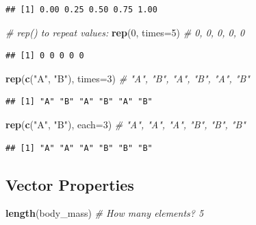 \documentclass[
]{article}
\newenvironment{Shaded}{\begin{snugshade}}{\end{snugshade}}
\newcommand{\AttributeTok}[1]{\textcolor[rgb]{0.13,0.29,0.53}{#1}}
\newcommand{\CommentTok}[1]{\textcolor[rgb]{0.56,0.35,0.01}{\textit{#1}}}
\newcommand{\DecValTok}[1]{\textcolor[rgb]{0.00,0.00,0.81}{#1}}
\newcommand{\FunctionTok}[1]{\textcolor[rgb]{0.13,0.29,0.53}{\textbf{#1}}}
\newcommand{\NormalTok}[1]{#1}
\newcommand{\StringTok}[1]{\textcolor[rgb]{0.31,0.60,0.02}{#1}}
\begin{document}
\begin{verbatim}
## [1] 0.00 0.25 0.50 0.75 1.00
\end{verbatim}

\begin{Shaded}
\begin{Highlighting}[]
\CommentTok{\# rep() to repeat values:}
\FunctionTok{rep}\NormalTok{(}\DecValTok{0}\NormalTok{, }\AttributeTok{times=}\DecValTok{5}\NormalTok{)                 }\CommentTok{\# 0, 0, 0, 0, 0}
\end{Highlighting}
\end{Shaded}

\begin{verbatim}
## [1] 0 0 0 0 0
\end{verbatim}

\begin{Shaded}
\begin{Highlighting}[]
\FunctionTok{rep}\NormalTok{(}\FunctionTok{c}\NormalTok{(}\StringTok{"A"}\NormalTok{, }\StringTok{"B"}\NormalTok{), }\AttributeTok{times=}\DecValTok{3}\NormalTok{)       }\CommentTok{\# "A", "B", "A", "B", "A", "B"}
\end{Highlighting}
\end{Shaded}

\begin{verbatim}
## [1] "A" "B" "A" "B" "A" "B"
\end{verbatim}

\begin{Shaded}
\begin{Highlighting}[]
\FunctionTok{rep}\NormalTok{(}\FunctionTok{c}\NormalTok{(}\StringTok{"A"}\NormalTok{, }\StringTok{"B"}\NormalTok{), }\AttributeTok{each=}\DecValTok{3}\NormalTok{)        }\CommentTok{\# "A", "A", "A", "B", "B", "B"}
\end{Highlighting}
\end{Shaded}

\begin{verbatim}
## [1] "A" "A" "A" "B" "B" "B"
\end{verbatim}

\subsection{Vector Properties}\label{vector-properties}

\begin{Shaded}
\begin{Highlighting}[]
\FunctionTok{length}\NormalTok{(body\_mass)     }\CommentTok{\# How many elements? 5}
\end{Highlighting}
\end{Shaded}
\end{document}
